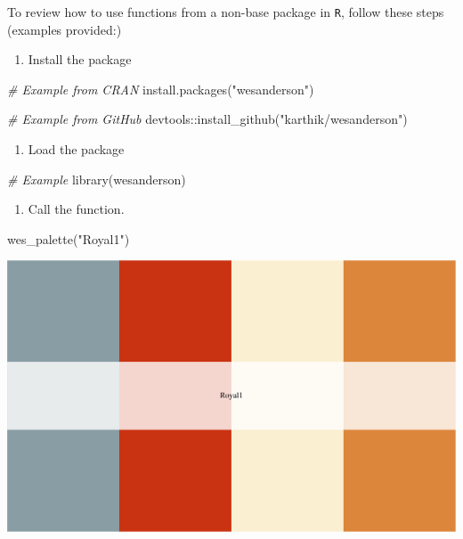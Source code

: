 \documentclass[
]{book}
\newenvironment{Shaded}{\begin{snugshade}}{\end{snugshade}}
\newcommand{\CommentTok}[1]{\textcolor[rgb]{0.56,0.35,0.01}{\textit{#1}}}
\newcommand{\FunctionTok}[1]{\textcolor[rgb]{0.00,0.00,0.00}{#1}}
\newcommand{\NormalTok}[1]{#1}
\newcommand{\SpecialCharTok}[1]{\textcolor[rgb]{0.00,0.00,0.00}{#1}}
\newcommand{\StringTok}[1]{\textcolor[rgb]{0.31,0.60,0.02}{#1}}
\providecommand{\tightlist}{%
  \setlength{\itemsep}{0pt}\setlength{\parskip}{0pt}}
\begin{document}
To review how to use functions from a non-base package in \texttt{R}, follow these steps (examples provided:)

\begin{enumerate}
\def\labelenumi{\arabic{enumi}.}
\tightlist
\item
  Install the package
\end{enumerate}

\begin{Shaded}
\begin{Highlighting}[]
\CommentTok{\# Example from CRAN}
\FunctionTok{install.packages}\NormalTok{(}\StringTok{"wesanderson"}\NormalTok{)}

\CommentTok{\# Example from GitHub}
\NormalTok{devtools}\SpecialCharTok{::}\FunctionTok{install\_github}\NormalTok{(}\StringTok{"karthik/wesanderson"}\NormalTok{)}
\end{Highlighting}
\end{Shaded}

\begin{enumerate}
\def\labelenumi{\arabic{enumi}.}
\setcounter{enumi}{1}
\tightlist
\item
  Load the package
\end{enumerate}

\begin{Shaded}
\begin{Highlighting}[]
\CommentTok{\# Example}
\FunctionTok{library}\NormalTok{(wesanderson)}
\end{Highlighting}
\end{Shaded}

\begin{enumerate}
\def\labelenumi{\arabic{enumi}.}
\setcounter{enumi}{2}
\tightlist
\item
  Call the function.
\end{enumerate}

\begin{Shaded}
\begin{Highlighting}[]
\FunctionTok{wes\_palette}\NormalTok{(}\StringTok{"Royal1"}\NormalTok{)}
\end{Highlighting}
\end{Shaded}

\includegraphics{figures/unnamed-chunk-132-1.pdf}
\end{document}
